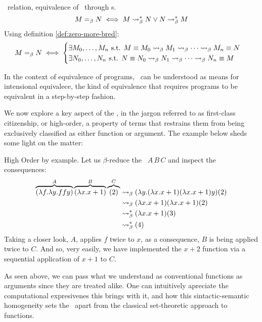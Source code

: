 \documentclass[12pt]{book}
\newcommand{\step}{\curly} %
\begin{document}
\begin{definition} \bequiv \ relation, equivalence of \lterms \ through \bred s.
  \[
    M =_\beta N \iff M \step^* N \lor N \step^* M
  \]
 Using definition \ref{def:zero-more-bred}:
  \[
    M =_\beta N \iff
    \begin{cases}
      \exists M_0, \dots, M_n \text{ s.t. } M \equiv M_0 \mathrel{\leadsto}_\beta M_1 \mathrel{\leadsto}_\beta \cdots \mathrel{\leadsto}_\beta M_n \equiv N \\
      \exists N_0, \dots, N_n \text{ s.t. } N \equiv N_0 \mathrel{\leadsto}_\beta N_1 \mathrel{\leadsto}_\beta \cdots \mathrel{\leadsto}_\beta N_n \equiv M
    \end{cases}
  \]
\end{definition}
\begin{remark}
  In the context of equivalence of programs, \bequiv \ can be understood as means for intensional equivalece, the kind of equivalence that requires programs to be equivalent in a step-by-step fashion.
\end{remark}
We now explore a key aspect of the \lcalc, in the jargon referred to as first-class citizenship, or high-order, a property of terms that restrains them from being exclusively classified as either function or argument. The example below sheds some light on the matter:
\begin{example} High Order by example. Let us $\beta$-reduce the \lterm \ $ A \, B \, C $ and inspect the consequences:
  \label{ex:high-order-by-example}
\begin{align*}
  \overbrace { (\lambda f . \lambda y . f f y) }^{A} \overbrace{ (\lambda x . x + 1) }^{B} \overbrace{(2)}^{C}
  &\mathrel{\leadsto}_\beta (\lambda y .(\lambda x . x + 1) (\lambda x . x + 1)y)(2) \\
  &\mathrel{\leadsto}_\beta (\lambda x . x + 1)(\lambda x . x + 1)(2) \\
  &\mathrel{\leadsto}_\beta^* (\lambda x . x + 1) (3) \\
  &\mathrel{\leadsto}_\beta^* (4)
\end{align*}
Taking a closer look, $A$, applies $f$ twice to $x$, as a consequence, $B$ is being applied twice to $C$. And so, very easily, we have implemented the $ x + 2 $ function via a sequential application of $x + 1$ to $C$.
\end{example}
\begin{remark}
  As seen above, we can pass what we understand as conventional functions as arguments since they are treated alike.  One can intuitively apreciate the computational expresivenes this brings with it, and how this sintactic-semantic homogeneity sets the \lcalc \ apart from the classical set-theoretic approach to functions.
\end{remark}
\end{document}
